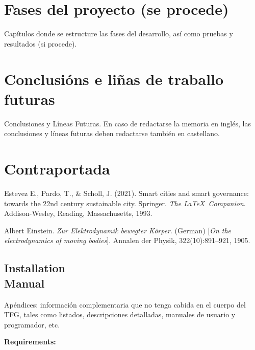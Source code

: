 \documentclass[12pt, a4paper, twoside]{article}
\begin{document}
\section{Fases del proyecto (se procede)}
Capítulos donde se estructure las fases del desarrollo, así como pruebas y resultados (si procede). 

\section{Conclusións e liñas de traballo futuras}
Conclusiones y Líneas Futuras. En caso de redactarse la memoria en inglés, las conclusiones y líneas futuras deben redactarse también en castellano.

\section{Contraportada}
\begin{thebibliography}{9}
Estevez E., Pardo, T., \& Scholl, J. (2021).
Smart cities and smart governance: towards the 22nd century sustainable city. Springer.
  \textit{The \LaTeX\ Companion}. 
  Addison-Wesley, Reading, Massachusetts, 1993.
  
  Albert Einstein. 
  \textit{Zur Elektrodynamik bewegter K{\"o}rper}. (German) 
  [\textit{On the electrodynamics of moving bodies}]. 
  Annalen der Physik, 322(10):891–921, 1905.

\end{thebibliography}

\newpage

\begin{umaappendices}
\section{Installation \\ Manual}
Apéndices: información complementaria que no tenga cabida en el cuerpo del TFG, tales como listados, descripciones detalladas, manuales de usuario y programador, etc. 
  
  \textbf{\large{Requirements:}}
  
  \blindtext

\end{umaappendices}
\end{document}
